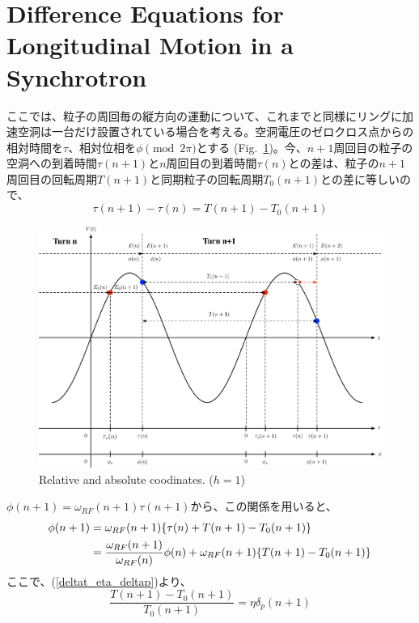 \documentclass[10pt,a4paper]{ltjsarticle}
\begin{document}
\section{Difference Equations for Longitudinal Motion in a Synchrotron}
ここでは、粒子の周回毎の縦方向の運動について、これまでと同様にリングに加速空洞は一台だけ設置されている場合を考える。空洞電圧のゼロクロス点からの相対時間を$\tau$、相対位相を$\phi\pmod{2\pi}$とする (Fig.~\ref{coordinates})。今、$n+1$周回目の粒子の空洞への到着時間$\tau(n+1)$と$n$周回目の到着時間$\tau(n)$との差は、粒子の$n+1$周回目の回転周期$T(n+1)$と同期粒子の回転周期$T_0(n+1)$との差に等しいので、
%
\begin{equation}
  \tau(n+1) - \tau(n) = T(n+1) -T_0(n+1)
  \label{tau_T}
\end{equation}
%
\begin{figure}[hhbt]
  \begin{center}
    \includegraphics[width=15cm,clip]{coordinates.pdf}
    \caption{Relative and absolute coodinates. ($h=1$)}
    \label{coordinates}
  \end{center}
\end{figure}
%
$\phi(n+1) = \omega_{RF}(n+1) \tau(n+1)$から、この関係を用いると、
%
\begin{align}
  \phi(n+1) &=\omega_{RF}(n+1)\{\tau(n) + T(n+1) -T_0(n+1)\} \notag \\
    &= \frac{\omega_{RF}(n+1)}{\omega_{RF}(n)} \phi(n) + \omega_{RF}(n+1)\{T(n+1) -T_0(n+1)\}  \notag
\end{align}
%
ここで、(\ref{deltat_eta_deltap})より、
%
\begin{equation}
    \frac{T(n+1)-T_0(n+1)}{T_0(n+1)} = \eta \delta_p(n+1)
\end{equation}
\end{document}
